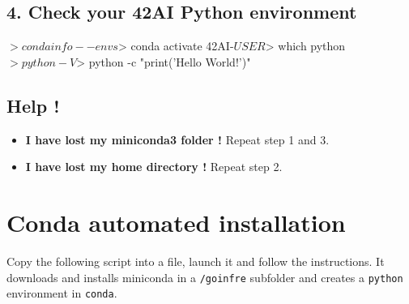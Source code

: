 \documentclass{42-en}
\begin{document}
\subsection*{4. Check your 42AI Python environment}
\begin{42console}
$> conda info --envs
$> conda activate 42AI-$USER
$> which python
$> python -V
$> python -c "print('Hello World!')"
\end{42console}



\subsection*{Help !}
\begin{itemize}
	\item \textbf{I have lost my miniconda3 folder !} Repeat step 1 and 3.
	\item \textbf{I have lost my home directory !} Repeat step 2.
\end{itemize}
\pagebreak



\section*{Conda automated installation}

Copy the following script into a file, launch it and follow the instructions. It downloads and installs miniconda in a \texttt{/goinfre} subfolder and creates a \texttt{python} environment in \texttt{conda}.
\end{document}
